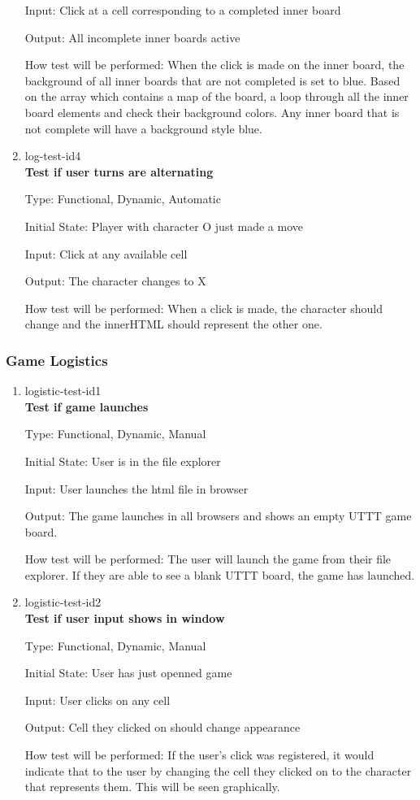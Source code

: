 \documentclass[12pt, titlepage]{article}
\begin{document}
\begin{enumerate}
Input: Click at a cell corresponding to a completed inner board
					
Output: All incomplete inner boards active
					
How test will be performed: When the click is made on the inner board, the
background of all inner boards that are not completed is set to blue. Based on
the array which contains a map of the board, a loop through all the inner
board elements and check their background colors. Any inner board that is not
complete will have a background style blue.

\item{log-test-id4\\}
\textbf{Test if user turns are alternating}

Type: Functional, Dynamic, Automatic
					
Initial State: Player with character O just made a move

Input: Click at any available cell
					
Output: The character changes to X
					
How test will be performed: When a click is made, the character should change
and the innerHTML should represent the other one.

\end{enumerate}

\subsubsection{Game Logistics}

\begin{enumerate}

\item{logistic-test-id1\\}
\textbf{Test if game launches}

Type: Functional, Dynamic, Manual
					
Initial State: User is in the file explorer
					
Input: User launches the html file in browser
					
Output: The game launches in all browsers and shows an empty UTTT game board.
					
How test will be performed: The user will launch the game from their file
explorer. If they are able to see a blank UTTT board, the game has launched.

\item{logistic-test-id2\\}
\textbf{Test if user input shows in window}

Type: Functional, Dynamic, Manual
					
Initial State: User has just openned game
					
Input: User clicks on any cell
					
Output: Cell they clicked on should change appearance
					
How test will be performed: If the user's click was registered, it would
indicate that to the user by changing the cell they clicked on to the
character that represents them. This will be seen graphically.

\end{enumerate}
\end{document}

